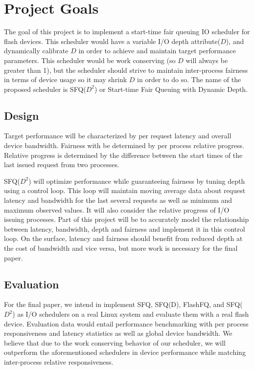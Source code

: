\section{Project Goals}

The goal of this project is to implement a start-time fair queuing IO
scheduler for flash devices. This scheduler would have a variable I/O
depth attribute($D$), and dynamically calibrate $D$ in order to
achieve and maintain target performance parameters. This scheduler
would be work conserving (so $D$ will always be greater than 1), but the
scheduler should strive to maintain inter-process fairness in terms of
device usage so it may shrink $D$ in order to do so. The name of the
proposed scheduler is SFQ($D^2$) or Start-time Fair Queuing with
Dynamic Depth.

\subsection{Design}

Target performance will be characterized by per request latency and
overall device bandwidth. Fairness with be determined by per process
relative progress. Relative progress is determined by the difference
between the start times of the last issued request from two processes.

SFQ($D^2$) will optimize performance while guaranteeing fairness by
tuning depth using a control loop. This loop will maintain moving
average data about request latency and bandwidth for the last several
requests as well as minimum and maximum observed values. It will also
consider the relative progress of I/O issuing processes. Part of this
project will be to accurately model the relationship between latency,
bandwidth, depth and fairness and implement it in this control
loop. On the surface, latency and fairness should benefit from reduced
depth at the cost of bandwidth and vice versa, but more work is
necessary for the final paper.

\subsection{Evaluation}

For the final paper, we intend in implement SFQ, SFQ(D), FlashFQ, and
SFQ($D^2$) as I/O schedulers on a real Linux system and evaluate them
with a real flash device. Evaluation data would entail performance
benchmarking with per process responsiveness and latency statistics as
well as global device bandwidth. We believe that due to the work
conserving behavior of our scheduler, we will outperform the
aforementioned schedulers in device performance while matching
inter-process relative responsiveness.
